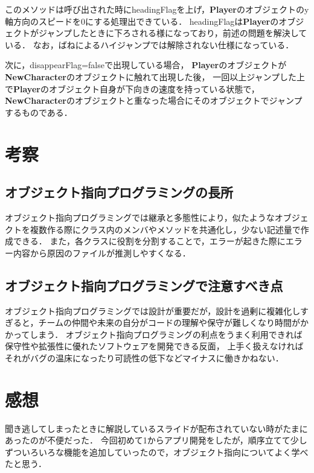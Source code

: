 \documentclass[titlepage,dvipdfmx]{jarticle}
\newcommand{\className}{\textbf}%
\begin{document}
このメソッドは呼び出された時にheadingFlagを上げ，\className{Player}のオブジェクトのy軸方向のスピードを0にする処理出できている．
headingFlagは\className{Player}のオブジェクトがジャンプしたときに下ろされる様になっており，前述の問題を解決している．
なお，ばねによるハイジャンプでは解除されない仕様になっている．

次に，disappearFlag=falseで出現している場合，
\className{Player}のオブジェクトが\className{NewCharacter}のオブジェクトに触れて出現した後，
一回以上ジャンプした上で\className{Player}のオブジェクト自身が下向きの速度を持っている状態で，
\className{NewCharacter}のオブジェクトと重なった場合にそのオブジェクトでジャンプするものである．
\section{考察}
\subsection{オブジェクト指向プログラミングの長所}
オブジェクト指向プログラミングでは継承と多態性により，似たようなオブジェクトを複数作る際にクラス内のメンバやメソッドを共通化し，少ない記述量で作成できる．
また，各クラスに役割を分割することで，エラーが起きた際にエラー内容から原因のファイルが推測しやすくなる．
\subsection{オブジェクト指向プログラミングで注意すべき点}
オブジェクト指向プログラミングでは設計が重要だが，設計を過剰に複雑化しすぎると，チームの仲間や未来の自分がコードの理解や保守が難しくなり時間がかかってしまう．
オブジェクト指向プログラミングの利点をうまく利用できれば保守性や拡張性に優れたソフトウェアを開発できる反面，
上手く扱えなければそれがバグの温床になったり可読性の低下などマイナスに働きかねない．
\section{感想}
聞き逃してしまったときに解説しているスライドが配布されていない時がたまにあったのが不便だった．
今回初めて1からアプリ開発をしたが，順序立てて少しずついろいろな機能を追加していったので，オブジェクト指向についてよく学べたと思う．
\end{document}
